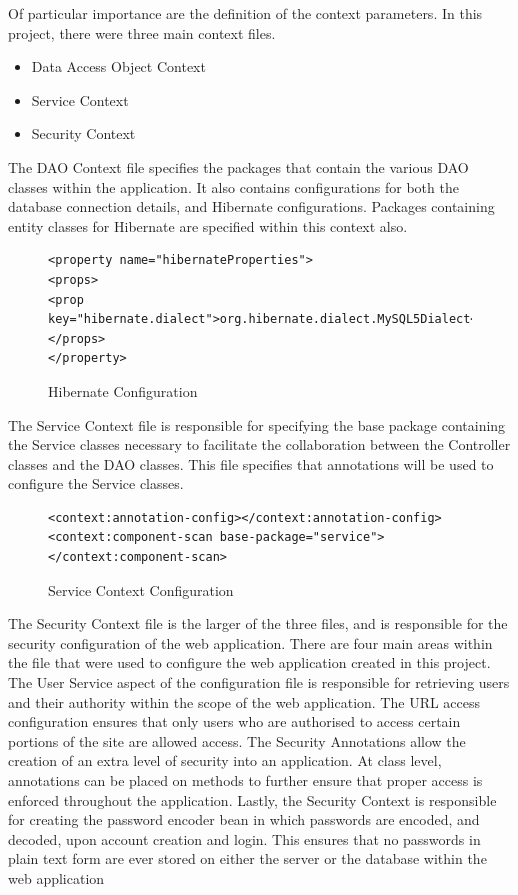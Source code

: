 Of particular importance are the definition of the context parameters. In this project, there were three main context files.

\begin{itemize}
\item Data Access Object Context
\item Service Context
\item Security Context
\end{itemize}

The DAO Context file specifies the packages that contain the various DAO classes within the application. It also contains configurations for both the database connection details, and Hibernate configurations. Packages containing entity classes for Hibernate are specified within this context also. \newline

\begin{figure}
\begin{lstlisting}
<property name="hibernateProperties">
<props>
<prop key="hibernate.dialect">org.hibernate.dialect.MySQL5Dialect</prop>
</props>
</property>
\end{lstlisting}
\caption{Hibernate Configuration}
\end{figure}


The Service Context file is responsible for specifying the base package containing the Service classes necessary to facilitate the collaboration between the Controller classes and the DAO classes. This file specifies that annotations will be used to configure the Service classes.\newline
\begin{figure}
\begin{lstlisting}
<context:annotation-config></context:annotation-config>
<context:component-scan base-package="service"></context:component-scan>
\end{lstlisting}
\caption{Service Context Configuration}
\end{figure}

The Security Context file is the larger of the three files, and is responsible for the security configuration of the web application. There are four main areas within the file that were used to configure the web application created in this project. \newline The User Service aspect of the configuration file is responsible for retrieving users and their authority within the scope of the web application. \newline The URL access configuration ensures that only users who are authorised to access certain portions of the site are allowed access. \newline The Security Annotations allow the creation of an extra level of security into an application. At class level, annotations can be placed on methods to further ensure that proper access is enforced throughout the application. \newline Lastly, the Security Context is responsible for creating the password encoder bean in which passwords are encoded, and decoded, upon account creation and login. This ensures that no passwords in plain text form are ever stored on either the server or the database within the web application \pagebreak

